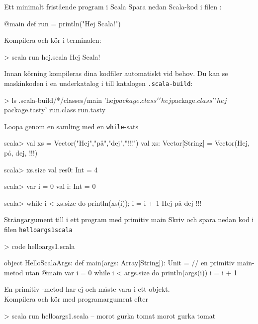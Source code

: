\begin{Slide}{Ett minimalt fristående program i Scala}\SlideFontSmall
Spara nedan Scala-kod i filen :
\begin{Code}
@main def run = println("Hej Scala!")
\end{Code}

Kompilera och kör i terminalen:
\begin{REPL}
> scala run hej.scala 
Hej Scala! 
\end{REPL}

Innan körning kompileras dina kodfiler automatiskt vid behov. Du kan se maskinkoden i en underkatalog i till katalogen \texttt{.scala-build}: 
\begin{REPL}
> ls .scala-build/*/classes/main
'hej$package.class'  'hej$package$.class'  'hej$package.tasty'   run.class   run.tasty
\end{REPL}
\end{Slide}


\begin{Slide}{Loopa genom en samling med en \texttt{while}-sats}
\begin{REPLnonum}
scala> val xs = Vector("Hej","på","dej","!!!")
val xs: Vector[String] =
  Vector(Hej, på, dej, !!!)

scala> xs.size
val res0: Int = 4

scala> var i = 0
val i: Int = 0

scala> while i < xs.size do { println(xs(i)); i = i + 1 }
Hej
på
dej
!!!
\end{REPLnonum}
\end{Slide}


\begin{Slide}{Strängargument till i ett program med primitiv main}
Skriv och spara nedan kod i filen \texttt{helloargs1scala}
\begin{REPLnonum}
> code helloargs1.scala
\end{REPLnonum}
\begin{Code}
object HelloScalaArgs:
  def main(args: Array[String]): Unit = // en primitiv main-metod utan @main
    var i = 0
    while i < args.size do
      println(args(i))
      i = i + 1
\end{Code}
En primitiv -metod har ej  och måste vara i ett objekt. \\
Kompilera och kör med programargument efter \code{--}
\begin{REPL}
> scala run helloargs1.scala -- morot gurka tomat
morot
gurka
tomat
\end{REPL}
\end{Slide}

